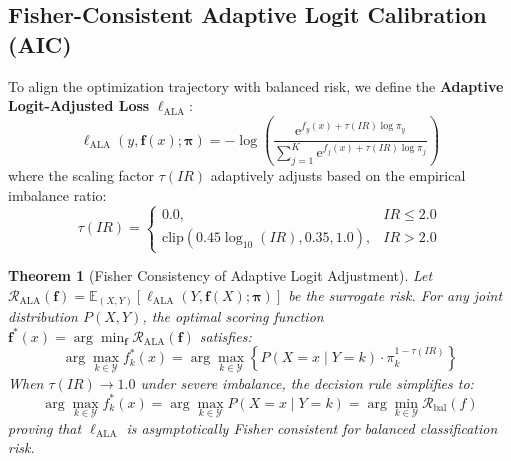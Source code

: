\documentclass[final,5p,times,twocolumn]{elsarticle}
\newtheorem{theorem}{Theorem}
\begin{document}
\subsection{Fisher-Consistent Adaptive Logit Calibration (AIC)}
\label{subsec:aic}

To align the optimization trajectory with balanced risk, we define the \textbf{Adaptive Logit-Adjusted Loss} $\ell_{\text{ALA}}$:
\begin{equation}
    \ell_{\text{ALA}}(y, \mathbf{f}(x); \boldsymbol{\pi}) = -\log \left( \frac{\mathrm{e}^{f_y(x) + \tau(IR) \log \pi_y}}{\sum_{j=1}^K \mathrm{e}^{f_j(x) + \tau(IR) \log \pi_j}} \right)
\end{equation}
where the scaling factor $\tau(IR)$ adaptively adjusts based on the empirical imbalance ratio:
\begin{equation}
    \tau(IR) = \begin{cases}
        0.0, & IR \le 2.0 \\
        \mathrm{clip}\left(0.45 \log_{10}(IR), 0.35, 1.0\right), & IR > 2.0
    \end{cases}
\end{equation}

\begin{theorem}[Fisher Consistency of Adaptive Logit Adjustment]
\label{thm:fisher_consistency}
Let $\mathcal{R}_{\text{ALA}}(\mathbf{f}) = \mathbb{E}_{(X, Y)} [\ell_{\text{ALA}}(Y, \mathbf{f}(X); \boldsymbol{\pi})]$ be the surrogate risk. For any joint distribution $P(X, Y)$, the optimal scoring function $\mathbf{f}^*(x) = \arg\min_{\mathbf{f}} \mathcal{R}_{\text{ALA}}(\mathbf{f})$ satisfies:
\begin{equation}
    \arg\max_{k \in \mathcal{Y}} f_k^*(x) = \arg\max_{k \in \mathcal{Y}} \left\{ P(X=x \mid Y=k) \cdot \pi_k^{1 - \tau(IR)} \right\}
\end{equation}
When $\tau(IR) \to 1.0$ under severe imbalance, the decision rule simplifies to:
\begin{equation}
    \arg\max_{k \in \mathcal{Y}} f_k^*(x) = \arg\max_{k \in \mathcal{Y}} P(X=x \mid Y=k) = \arg\min_{k \in \mathcal{Y}} \mathcal{R}_{\text{bal}}(f)
\end{equation}
proving that $\ell_{\text{ALA}}$ is asymptotically Fisher consistent for balanced classification risk.
\end{theorem}
\end{document}
